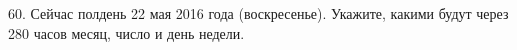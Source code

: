 60. Сейчас полдень 22 мая 2016 года (воскресенье). Укажите, какими будут через 280 часов месяц, число и день недели.\\
